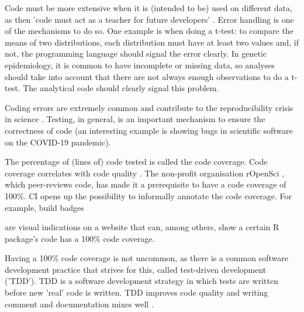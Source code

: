 Code must be more extensive when it is (intended to be) 
used on different data,
as then 'code must act as a teacher for future developers' \cite{sadowski2018modern}.
Error handling is one of the mechanisms to do so.
One example is when doing a t-test:
to compare the means of two distributions, each distribution
must have at least two values
and, if not, the programming language should signal the error clearly.
In genetic epidemiology, it is common to have incomplete or missing data,
so analyses should take into account that there are not always enough
observations to do a t-test.
The analytical code should clearly signal this problem.


Coding errors are extremely common 
and contribute to the reproducibility crisis in science \cite{vable2021code}.
Testing, in general, is an important mechanism to ensure
the correctness of code (an interesting example is \cite{rahman2020exploratory}
showing bugs in scientific software on the COVID-19 pandemic).


The percentage of (lines of) code tested is called the code coverage.
Code coverage correlates with code quality \cite{horgan1994,del1995correlation}. 
The non-profit organisation rOpenSci \cite{ram2018community},
which peer-reviews code,
has made it a prerequisite to have a code coverage of 100\%.
CI opens up the possibility to informally annotate the
code coverage. 
For example, build badges

are visual indications on a website that can, among others,
show a certain R package's code has a 100\% code coverage.


Having a 100\% code coverage is not uncommon,
as there is a common software development practice that 
strives for this, called test-driven development ('TDD'). 
TDD is a software development strategy in which tests are written
before new 'real' code is written.
TDD improves code quality \cite{alkaoud2018quality,janzen2006test}
and writing comment and documentation mixes well \cite{shmerlin2015document}.

